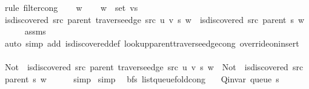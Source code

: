 \begin{isabellebody}
%
\isadelimproof
%
\endisadelimproof
%
\isatagproof
{}\isamarkupfalse%
\ {\isacharparenleft}{\kern0pt}rule\ filter{\isacharunderscore}{\kern0pt}cong{\isacharparenright}{\kern0pt}\isanewline
\ \ \isamarkupfalse%
\ w\isanewline
\ \ \isamarkupfalse%
\ {\isachardoublequoteopen}w\ {\isasymin}\ set\ vs{\isachardoublequoteclose}\isanewline
\ \ \isamarkupfalse%
\ {\isachardoublequoteopen}is{\isacharunderscore}{\kern0pt}discovered\ src\ {\isacharparenleft}{\kern0pt}parent\ {\isacharparenleft}{\kern0pt}traverse{\isacharunderscore}{\kern0pt}edge\ src\ u\ v\ s{\isacharparenright}{\kern0pt}{\isacharparenright}{\kern0pt}\ w\ {\isacharequal}{\kern0pt}\ is{\isacharunderscore}{\kern0pt}discovered\ src\ {\isacharparenleft}{\kern0pt}parent\ s{\isacharparenright}{\kern0pt}\ w{\isachardoublequoteclose}\isanewline
\ \ \ \ \isamarkupfalse%
\ assms\isanewline
\ \ \ \ \isamarkupfalse%
\ {\isacharparenleft}{\kern0pt}auto\ simp\ add{\isacharcolon}{\kern0pt}\ is{\isacharunderscore}{\kern0pt}discovered{\isacharunderscore}{\kern0pt}def\ lookup{\isacharunderscore}{\kern0pt}parent{\isacharunderscore}{\kern0pt}traverse{\isacharunderscore}{\kern0pt}edge{\isacharunderscore}{\kern0pt}cong\ override{\isacharunderscore}{\kern0pt}on{\isacharunderscore}{\kern0pt}insert{\isacharprime}{\kern0pt}{\isacharparenright}{\kern0pt}\isanewline
\ \ \isamarkupfalse%
\ {\isachardoublequoteopen}{\isacharparenleft}{\kern0pt}Not\ {\isasymcirc}\ is{\isacharunderscore}{\kern0pt}discovered\ src\ {\isacharparenleft}{\kern0pt}parent\ {\isacharparenleft}{\kern0pt}traverse{\isacharunderscore}{\kern0pt}edge\ src\ u\ v\ s{\isacharparenright}{\kern0pt}{\isacharparenright}{\kern0pt}{\isacharparenright}{\kern0pt}\ w\ {\isacharequal}{\kern0pt}\ {\isacharparenleft}{\kern0pt}Not\ {\isasymcirc}\ is{\isacharunderscore}{\kern0pt}discovered\ src\ {\isacharparenleft}{\kern0pt}parent\ s{\isacharparenright}{\kern0pt}{\isacharparenright}{\kern0pt}\ w{\isachardoublequoteclose}\isanewline
\ \ \ \ \isamarkupfalse%
\ simp\isanewline
{}\isamarkupfalse%
\ simp%
\endisatagproof
{\isafoldproof}%
%
\isadelimproof
\isanewline
%
\endisadelimproof
\isanewline
{}\isamarkupfalse%
\ {\isacharparenleft}{\kern0pt}\ bfs{\isacharparenright}{\kern0pt}\ list{\isacharunderscore}{\kern0pt}queue{\isacharunderscore}{\kern0pt}fold{\isacharunderscore}{\kern0pt}cong{\isacharcolon}{\kern0pt}\isanewline
\ \ \ {\isachardoublequoteopen}Q{\isacharunderscore}{\kern0pt}invar\ {\isacharparenleft}{\kern0pt}queue\ s{\isacharparenright}{\kern0pt}{\isachardoublequoteclose}\isanewline

\end{isabellebody}
